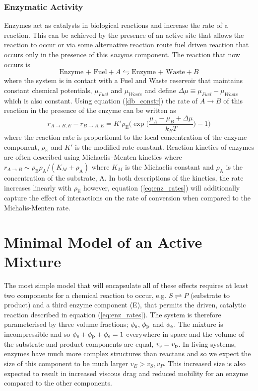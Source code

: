\subsubsection{Enzymatic Activity}
Enzymes act as catalysts in biological reactions and increase the rate of a reaction. This can be achieved by the presence of an active site that allows the reaction to occur or via some alternative reaction route    fuel driven reaction that occurs only in the presence of this \textit{enzyme} component. The reaction that now occurs is
\begin{equation}
    \text{Enzyme + Fuel} + A \leftrightharpoons \text{Enzyme + Waste} + B
\end{equation}
where the system is in contact with a Fuel and Waste reservoir that maintains constant chemical potentials, $\mu_{Fuel}$ and $\mu_{Waste}$ and define $\Delta\mu \equiv \mu_{Fuel}-\mu_{Waste}$ which is also constant. Using equation (\ref{db_constr}) the rate of $A \rightarrow B$ of this reaction in the presence of the enzyme can be written as
\begin{equation}
    r_{A \rightarrow B,E} - r_{B \rightarrow A,E} = K'\rho_\textrm{E}\Bigg(\exp\bigg(\frac{\mu_A - \mu_B + \Delta\mu}{k_B T}\bigg)-1\Bigg)
    \label{eq:enz_rates}
\end{equation}
where the reaction rate is proportional to the local concentration of the enzyme component, $\rho_\textrm{E}$ and $K'$ is the modified rate constant. Reaction kinetics of enzymes are often described using Michaelis–Menten kinetics where $r_{A\rightarrow B}\sim\rho_\textrm{E}\rho_\textrm{A}/(K_{M}+\rho_\textrm{A})$ where $K_M$ is the Michaelis constant and $\rho_\textrm{A}$ is the concentration of the substrate, A\cite{murray_mathematical_1993}. In both  descriptions of the kinetics, the rate increases linearly with $\rho_\textrm{E}$ however, equation (\ref{eq:enz_rates}) will additionally capture the effect of interactions on the rate of conversion when compared to the Michalis-Menten rate.

\section{Minimal Model of an Active Mixture}

The most simple model that will encapsulate all of these effects requires at least two components for a chemical reaction to occur, e.g. $S \rightleftharpoons P$ (substrate to product) and a third enzyme component (E), that permits the driven, catalytic reaction described in equation (\ref{eq:enz_rates}). The system is therefore parameterised by three volume fractions; $\phi_{\mathrm{s}}$, $\phi_{\mathrm{p}}$ and $\phi_{\mathrm{e}}$. The mixture is incompressible and so $\phi_{\mathrm{s}}+\phi_{\mathrm{p}}+\phi_{\mathrm{e}}=1$ everywhere in space and the volume of the substrate and product components are equal, $v_{\mathrm{s}} = v_{\mathrm{p}}$. In living systems, enzymes have much more complex structures than reactans and so we expect the size of this component to be much larger $v_E > v_S, v_P$\cite{berg_biochemistry_2002}. This increased size is also expected to result in increased viscous drag and reduced mobility for an enzyme compared to the other components.

